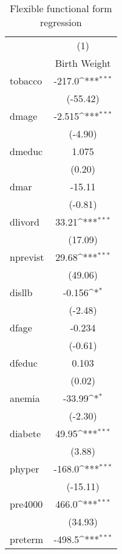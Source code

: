 {
\def\sym#1{\ifmmode^{#1}\else\(^{#1}\)\fi}
\begin{longtable}{l*{1}{c}}
\caption{Flexible functional form regression\label{c1}}\\
\hline\hline\endfirsthead\hline\endhead\hline\endfoot\endlastfoot
            &\multicolumn{1}{c}{(1)}\\
            &\multicolumn{1}{c}{Birth Weight}\\
\hline
tobacco     &      -217.0\sym{***}\\
            &    (-55.42)         \\
[1em]
dmage       &      -2.515\sym{***}\\
            &     (-4.90)         \\
[1em]
dmeduc      &       1.075         \\
            &      (0.20)         \\
[1em]
dmar        &      -15.11         \\
            &     (-0.81)         \\
[1em]
dlivord     &       33.21\sym{***}\\
            &     (17.09)         \\
[1em]
nprevist    &       29.68\sym{***}\\
            &     (49.06)         \\
[1em]
disllb      &      -0.156\sym{*}  \\
            &     (-2.48)         \\
[1em]
dfage       &      -0.234         \\
            &     (-0.61)         \\
[1em]
dfeduc      &       0.103         \\
            &      (0.02)         \\
[1em]
anemia      &      -33.99\sym{*}  \\
            &     (-2.30)         \\
[1em]
diabete     &       49.95\sym{***}\\
            &      (3.88)         \\
[1em]
phyper      &      -168.0\sym{***}\\
            &    (-15.11)         \\
[1em]
pre4000     &       466.0\sym{***}\\
            &     (34.93)         \\
[1em]
preterm     &      -498.5\sym{***}\\

\end{longtable}}

